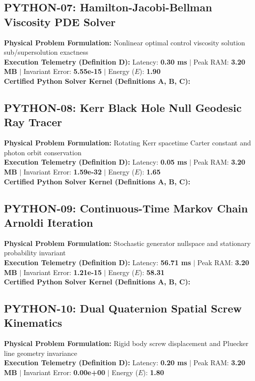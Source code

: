 \vspace{1em}
\subsection{PYTHON-07: Hamilton-Jacobi-Bellman Viscosity PDE Solver}
\textbf{Physical Problem Formulation:} Nonlinear optimal control viscosity solution sub/supersolution exactness\\
\textbf{Execution Telemetry (Definition D):} Latency: \textbf{0.30 ms} $|$ Peak RAM: \textbf{3.20 MB} $|$ Invariant Error: \textbf{5.55e-15} $|$ Energy ($E$): \textbf{1.90}\\

\textbf{Certified Python Solver Kernel (Definitions A, B, C):}


\vspace{1em}
\subsection{PYTHON-08: Kerr Black Hole Null Geodesic Ray Tracer}
\textbf{Physical Problem Formulation:} Rotating Kerr spacetime Carter constant and photon orbit conservation\\
\textbf{Execution Telemetry (Definition D):} Latency: \textbf{0.05 ms} $|$ Peak RAM: \textbf{3.20 MB} $|$ Invariant Error: \textbf{1.59e-32} $|$ Energy ($E$): \textbf{1.65}\\

\textbf{Certified Python Solver Kernel (Definitions A, B, C):}


\vspace{1em}
\subsection{PYTHON-09: Continuous-Time Markov Chain Arnoldi Iteration}
\textbf{Physical Problem Formulation:} Stochastic generator nullspace and stationary probability invariant\\
\textbf{Execution Telemetry (Definition D):} Latency: \textbf{56.71 ms} $|$ Peak RAM: \textbf{3.20 MB} $|$ Invariant Error: \textbf{1.21e-15} $|$ Energy ($E$): \textbf{58.31}\\

\textbf{Certified Python Solver Kernel (Definitions A, B, C):}


\vspace{1em}
\subsection{PYTHON-10: Dual Quaternion Spatial Screw Kinematics}
\textbf{Physical Problem Formulation:} Rigid body screw displacement and Pluecker line geometry invariance\\
\textbf{Execution Telemetry (Definition D):} Latency: \textbf{0.20 ms} $|$ Peak RAM: \textbf{3.20 MB} $|$ Invariant Error: \textbf{0.00e+00} $|$ Energy ($E$): \textbf{1.80}\\

